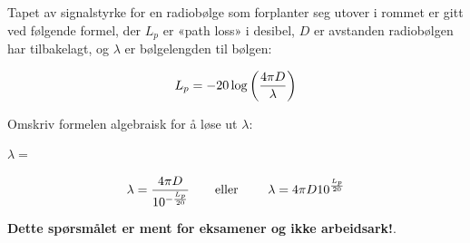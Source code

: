 

Tapet av signalstyrke for en radiobølge som forplanter seg utover i rommet er gitt ved følgende formel, der $L_p$ er «path loss» i desibel, $D$ er avstanden radiobølgen har tilbakelagt, og $\lambda$ er bølgelengden til bølgen:
 
$$L_p = -20 \log \left({4 \pi D \over \lambda}\right)$$

Omskriv formelen algebraisk for å løse ut $\lambda$:

\vskip 20pt

$\lambda = $







$$\lambda = {4 \pi D \over 10^{-{L_p \over 20}}} \hbox{\hskip 20pt eller \hskip 20pt} \lambda = {4 \pi D 10^{L_p \over 20}}$$







{\bf Dette spørsmålet er ment for eksamener og ikke arbeidsark!}.


